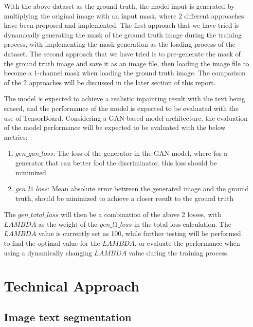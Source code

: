 \documentclass[10pt,twocolumn,letterpaper]{article}
\begin{document}
With the above dataset as the ground truth, the model input is generated by multiplying the original image with an input mask, where 2 different approaches have been 
proposed and implemented. The first approach that we have tried is dynamically generating the mask of the ground truth image during the training process, with implementing
the mask generation as the loading process of the dataset. The second approach that we have tried is to pre-generate the mask of the ground truth image and save it as an image
file, then loading the image file to become a 1-channel mask when loading the ground truth image. The comparison of the 2 approaches will be discussed in the later 
section of this report.

The model is expected to achieve a realistic inpainting result with the text being erased, and the performance of the model is expected to be evaluated with the
use of TensorBoard. Considering a GAN-based model architecture, the evaluation of the model performance will be expected to be evaluated with the below metrics:
\begin{enumerate}
    \item $gen\_gan\_loss$: The loss of the generator in the GAN model, where for a generator that can better fool the discriminator, this loss should be minimized
    \item $gen\_l1\_loss$: Mean absolute error between the generated image and the ground truth, should be minimized to achieve a closer result to the ground truth
\end{enumerate}

The $gen\_total\_loss$ will then be a combination of the above 2 losses, with $LAMBDA$ as the weight of the $gen\_l1\_loss$ in the total loss calculation. The $LAMBDA$
value is currently set as 100, while further testing will be performed to find the optimal value for the $LAMBDA$, or evaluate the performance when using a dynamically
changing $LAMBDA$ value during the training process.

\section{Technical Approach}

\subsection{Image text segmentation}
\end{document}
